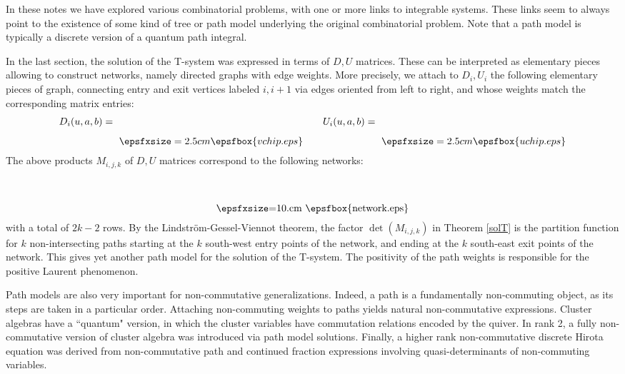 \documentclass[12pt]{amsart}
\numberwithin{equation}{section}
\begin{document}
In these notes we have explored various combinatorial problems, with one or more links to integrable systems.
These links seem to always point to the existence of some kind of tree or path model underlying the
original combinatorial problem. Note that a path model is typically a discrete version
of a quantum path integral.

In the last section, the solution of the T-system was expressed in terms of $D,U$ matrices. These can be interpreted as
elementary pieces allowing to construct networks, namely directed graphs with edge weights. More precisely,
we attach to $D_i,U_i$ the following elementary pieces of graph, connecting entry and exit vertices labeled $i,i+1$
via edges oriented from left to right, and whose weights match the corresponding matrix entries:
$$ D_i(u,a,b)= \raise-.7cm\hbox{ $\epsfxsize=2.5cm \epsfbox{vchip.eps}  $}\qquad 
U_i(u,a,b)= \raise-.7cm\hbox{ $\epsfxsize=2.5cm \epsfbox{uchip.eps}  $}$$
The above products $M_{i,j,k}$ of $D,U$ matrices correspond to the following networks:
$$ \raisebox{-1.cm}{\hbox{\epsfxsize=10.cm \epsfbox{network.eps}}} $$
with a total of $2k-2$ rows.
By the Lindstr\"om-Gessel-Viennot theorem,
the factor $\det(M_{i,j,k})$ in Theorem \ref{solT}
is the partition function for $k$ non-intersecting paths starting at the $k$ south-west entry points of
the network, and ending at the $k$ south-east exit points of the network. This gives yet another path model for the
solution of the T-system. The positivity of the path weights is responsible for the positive
Laurent phenomenon.

Path models are also very important for non-commutative generalizations. Indeed, a path is a fundamentally
non-commuting object, as its steps are taken in a particular order. Attaching non-commuting weights to paths
yields natural non-commutative expressions. Cluster algebras have a ``quantum" version, in which the cluster
variables have commutation relations encoded by the quiver\cite{BZ}. In rank 2, a fully non-commutative version of cluster algebra
was introduced via path model solutions\cite{DFK09b,DFK10}. Finally, a higher rank non-commutative discrete 
Hirota equation was derived\cite{DFK10} from non-commutative path and continued fraction expressions involving
quasi-determinants of non-commuting variables. 
\end{document}
